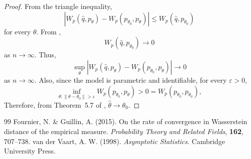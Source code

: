\documentclass[10pt,a4paper]{amsart}
\begin{document}
\begin{proof}
	From the triangle inequality,
	\[
	|W_p(\hat{q},p_{\theta}) - W_p(p_{\theta_0},p_{\theta})| \leq W_p(\hat{q},p_{\theta_0})
	\]
	for every $\theta$.
	From \cite{Fournier},
	\[
	W_p(\hat{q},p_{\theta_0}) \to 0
	\]
	as $n \to \infty$.
	Thus,
	\[
	\sup_{\theta} |W_p(\hat{q},p_{\theta}) - W_p(p_{\theta_0},p_{\theta})| \to 0
	\]
	as $n \to \infty$.
	Also, since the model is parametric and  identifiable, for every $\varepsilon>0$,
	\[
	\inf_{\theta: \| \theta-\theta_0 \| > \varepsilon} W_p(p_{\theta_0},p_{\theta}) > 0 = W_p(p_{\theta_0},p_{\theta_0}),
	\]
	Therefore, from Theorem~5.7 of \cite{vV}, $\hat{\theta} \to \theta_0$.
\end{proof}

\begin{thebibliography}{99}
 Fournier, N. \& Guillin, A. (2015). On the rate of convergence in Wasserstein distance of the empirical measure. \textit{Probability Theory and Related Fields}, \textbf{162}, 707--738.
 van der Vaart, A. W. (1998). \textit{Asymptotic Statistics}. Cambridge University Press.
\end{thebibliography}
\end{document}
